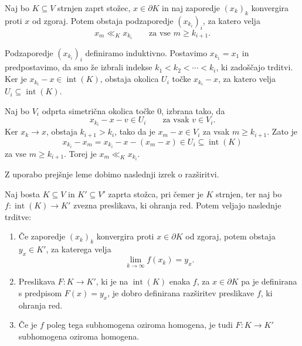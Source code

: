 \documentclass[mat2, tisk]{fmfdelo}
\begin{document}
\begin{lema}\label{lema:podzaporedje_od_zgoraj}
Naj bo $K\subseteq V$ strnjen zaprt stožec, $x\in\partial K$ in naj
zaporedje $(x_k)_k$ konvergira proti $x$ od zgoraj. Potem obstaja
podzaporedje $(x_{k_i})_i$, za katero velja
\begin{equation*}
x_m\ll_K x_{k_i}
\qquad\text{za vse }m\geq k_{i+1}.
\end{equation*}
\end{lema}

\begin{dokaz}
Podzaporedje $(x_{k_i})_i$ definiramo induktivno. Postavimo
$x_{k_1}=x_1$ in predpostavimo, da smo že izbrali indekse
$k_1<k_2<\cdots<k_i$, ki zadoščajo trditvi. Ker je
$x_{k_i}-x\in\operatorname{int}(K)$, obstaja okolica $U_i$ točke
$x_{k_i}-x$, za katero velja
$U_i\subseteq\operatorname{int}(K)$.

Naj bo $V_i$ odprta simetrična okolica točke $0$, izbrana tako, da
\begin{equation*}
x_{k_i}-x-v\in U_i
\qquad\text{za vsak }v\in V_i.
\end{equation*}
Ker $x_k\longrightarrow x$, obstaja $k_{i+1}>k_i$, tako da je
$x_m-x\in V_i$ za vsak $m\geq k_{i+1}$. Zato je
\begin{equation*}
x_{k_i}-x_m
=
x_{k_i}-x-(x_m-x)
\in U_i
\subseteq\operatorname{int}(K)
\end{equation*}
za vse $m\geq k_{i+1}$. Torej je $x_m\ll_K x_{k_i}$.
\end{dokaz}

Z uporabo prejšnje leme dobimo naslednji izrek o razširitvi.

\begin{izrek}\label{izr:razsiritev_preslikave_na_stozec}
Naj bosta $K\subseteq V$ in $K'\subseteq V'$ zaprta stožca, pri
čemer je $K$ strnjen, ter naj bo
$f\colon\operatorname{int}(K)\longrightarrow K'$ zvezna preslikava,
ki ohranja red. Potem veljajo naslednje trditve:
\begin{enumerate}[label= (\roman*)]
\item Če zaporedje $(x_k)_k$ konvergira proti $x\in\partial K$ od zgoraj,
potem obstaja $y_x\in K'$, za katerega velja
\begin{equation*}
\lim_{k\to\infty}f(x_k)=y_x.
\end{equation*}

\item Preslikava $F\colon K\longrightarrow K'$, ki je na
$\operatorname{int}(K)$ enaka $f$, za $x\in\partial K$ pa je
definirana s predpisom $F(x)=y_x$, je dobro definirana razširitev
preslikave $f$, ki ohranja red.

\item Če je $f$ poleg tega subhomogena oziroma homogena, je tudi
$F\colon K\longrightarrow K'$ subhomogena oziroma homogena.
\end{enumerate}
\end{izrek}
\end{document}
